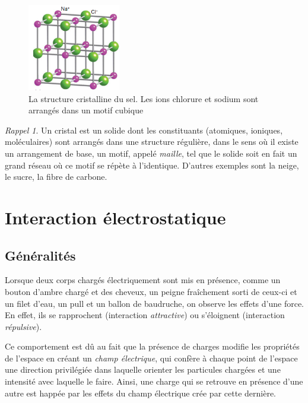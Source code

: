 \documentclass{article}
\theoremstyle{definition}
\theoremstyle{remark}
\newtheorem*{rap}{Rappel}
\begin{document}
\begin{itemize}
\begin{figure}[h]
	\centering
	\includegraphics[width=0.36\textwidth]{parts/electrostat/sel_cristal.png}
	\caption{La structure cristalline du sel. Les ions chlorure et sodium sont arrangés dans un motif cubique}
\end{figure}

\begin{rap} Un cristal est un solide dont les constituants (atomiques, ioniques, moléculaires) sont arrangés dans une structure régulière, dans le sens où il existe un arrangement de base, un motif, appelé \textit{maille}, tel que le solide soit en fait un grand réseau où ce motif se répète à l'identique. D'autres exemples sont la neige, le sucre, la fibre de carbone.
\end{rap}

\end{itemize}

\section{Interaction électrostatique}

\subsection{Généralités}

Lorsque deux corps chargés électriquement sont mis en présence, comme un bouton d'ambre chargé et des cheveux, un peigne fraîchement sorti de ceux-ci et un filet d'eau, un pull et un ballon de baudruche, on observe les effets d'une force. En effet, ils se rapprochent (interaction \textit{attractive}) ou s'éloignent (interaction \textit{répulsive}).

Ce comportement est dû au fait que la présence de charges modifie les propriétés de l'espace en créant un \textit{champ électrique}, qui confère à chaque point de l'espace une direction privilégiée dans laquelle orienter les particules chargées et une intensité avec laquelle le faire. Ainsi, une charge qui se retrouve en présence d'une autre est happée par les effets du champ électrique crée par cette dernière.
\end{document}
